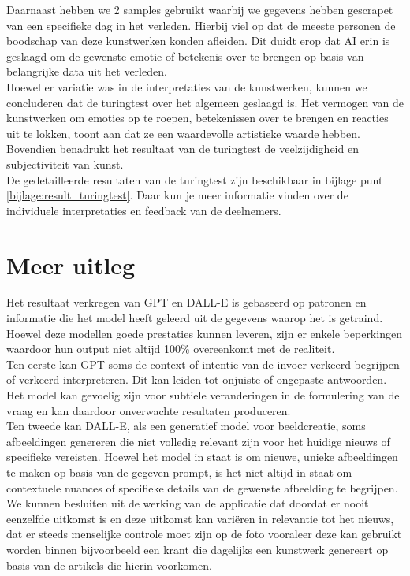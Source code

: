 Daarnaast hebben we 2 samples gebruikt waarbij we gegevens hebben gescrapet van een specifieke dag in het verleden. Hierbij viel op dat de meeste personen de boodschap van deze kunstwerken konden afleiden. Dit duidt erop dat AI erin is geslaagd om de gewenste emotie of betekenis over te brengen op basis van belangrijke data uit het verleden.  \\

Hoewel er variatie was in de interpretaties van de kunstwerken, kunnen we concluderen dat de turingtest over het algemeen geslaagd is. Het vermogen van de kunstwerken om emoties op te roepen, betekenissen over te brengen en reacties uit te lokken, toont aan dat ze een waardevolle artistieke waarde hebben. Bovendien benadrukt het resultaat van de turingtest de veelzijdigheid en subjectiviteit van kunst. \\

De gedetailleerde resultaten van de turingtest zijn beschikbaar in bijlage punt \ref{bijlage:result_turingtest}. Daar kun je meer informatie vinden over de individuele interpretaties en feedback van de deelnemers.

 
\section{Meer uitleg}
Het resultaat verkregen van GPT en DALL-E is gebaseerd op patronen en informatie die het model heeft geleerd uit de gegevens waarop het is getraind. Hoewel deze modellen goede prestaties kunnen leveren, zijn er enkele beperkingen waardoor hun output niet altijd 100\% overeenkomt met de realiteit. \\

Ten eerste kan GPT soms de context of intentie van de invoer verkeerd begrijpen of verkeerd interpreteren. Dit kan leiden tot onjuiste of ongepaste antwoorden. Het model kan gevoelig zijn voor subtiele veranderingen in de formulering van de vraag en kan daardoor onverwachte resultaten produceren. \\

Ten tweede kan DALL-E, als een generatief model voor beeldcreatie, soms afbeeldingen genereren die niet volledig relevant zijn voor het huidige nieuws of specifieke vereisten. Hoewel het model in staat is om nieuwe, unieke afbeeldingen te maken op basis van de gegeven prompt, is het niet altijd in staat om contextuele nuances of specifieke details van de gewenste afbeelding te begrijpen. \\

We kunnen besluiten uit de werking van de applicatie dat doordat er nooit eenzelfde uitkomst is en deze uitkomst kan variëren in relevantie tot het nieuws, dat er steeds menselijke controle moet zijn op de foto vooraleer deze kan gebruikt worden binnen bijvoorbeeld een krant die dagelijks een kunstwerk genereert op basis van de artikels die hierin voorkomen. 
